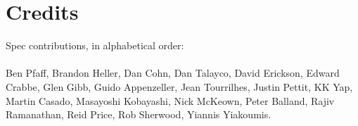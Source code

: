 \section{Credits}

Spec contributions, in alphabetical order:
\\\\
Ben Pfaff,
Brandon Heller,
Dan Cohn,
Dan Talayco,
David Erickson,
Edward Crabbe,
Glen Gibb,
Guido Appenzeller,
Jean Tourrilhes,
Justin Pettit,
KK Yap,
Martin Casado,
Masayoshi Kobayashi,
Nick McKeown,
Peter Balland,
Rajiv Ramanathan,
Reid Price,
Rob Sherwood,
Yiannis Yiakoumis.
